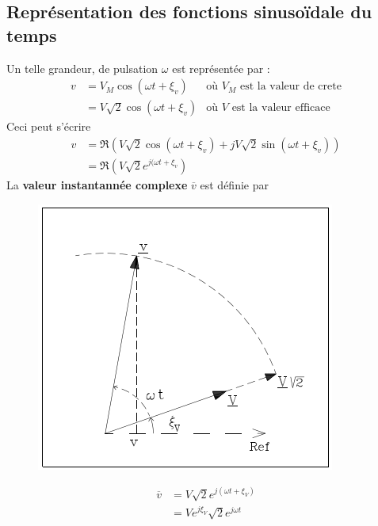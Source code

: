\subsection{Représentation des fonctions sinusoïdale du temps}
Un telle grandeur, de pulsation $\omega$ est représentée par :
\begin{equation}
	\begin{array}{lll}
		v & = V_M\cos(\omega t + \xi_v)       & \text{où $V_M$ est la valeur de crete} \\
		  & = V\sqrt{2}\cos(\omega t + \xi_v) & \text{où $V$ est la valeur efficace}   
	\end{array}
\end{equation}
Ceci peut s'écrire 
\begin{equation}
	\begin{array}{ll}
		v & = \Re (V\sqrt{2}\cos(\omega t + \xi_v) + jV\sqrt{2}\sin(\omega t + \xi_v)) \\
		  & = \Re (V\sqrt{2}e^{j(\omega t + \xi_v})                                    
	\end{array}
\end{equation}
La \textbf{valeur instantannée complexe} $\overline{v}$ est définie par \\
\begin{figure}
	\vspace{-15mm}
	\includegraphics[scale=0.4]{ch1/image2.png}
\end{figure}
\begin{equation}
	\begin{array}{ll}
		\overline{v} & = V \sqrt{2}e^{j(\omega t + \xi_V)} \\
		             & = V e^{j\xi_V}\sqrt{2}e^{j\omega t} 
	\end{array}
\end{equation}
